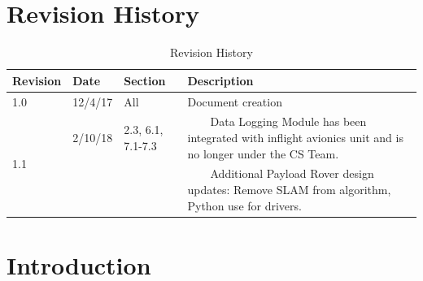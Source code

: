 \documentclass[onecolumn, draftclsnofoot,10pt, compsoc]{IEEEtran}
\newcommand{\tabitem}{~~\llap{\textbullet}~~}
\begin{document}
\section{Revision History}
\begin{table}[h]
\centering
\caption{Revision History}
\label{my-label}
\begin{tabular}{@{}lllp{12cm}@{}}
\toprule
\textbf{Revision}    & \textbf{Date}            & \textbf{Section}  & \textbf{Description}                                                                                                                                             \\ \midrule
1.0                  & 12/4/17                  & All               & Document creation                                                                                                                                                \\ \midrule
\multirow{2}{*}{1.1} & 2/10/18 & 2.3, 6.1, 7.1-7.3 & \tabitem Data Logging Module has been integrated with inflight avionics unit and is no longer under the CS Team. \\
                     &                          &                   &\tabitem Additional Payload Rover design updates: Remove SLAM from algorithm, Python use for drivers.                                                                                                                                                                 \\ \bottomrule
\end{tabular}
\end{table}


\section{Introduction}
\end{document}

